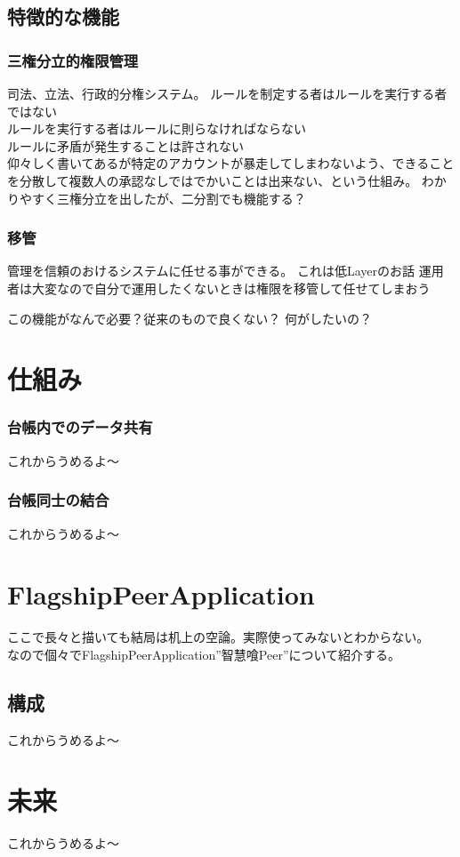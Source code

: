 \documentclass[10pt,a4paper]{jarticle}
\begin{document}
\begin{multicols}{2}
\subsection{特徴的な機能}

\subsubsection{三権分立的権限管理}
司法、立法、行政的分権システム。
ルールを制定する者はルールを実行する者ではない\\
ルールを実行する者はルールに則らなければならない\\
ルールに矛盾が発生することは許されない\\

仰々しく書いてあるが特定のアカウントが暴走してしまわないよう、できることを分散して複数人の承認なしではでかいことは出来ない、という仕組み。
わかりやすく三権分立を出したが、二分割でも機能する？

\subsubsection{移管}
管理を信頼のおけるシステムに任せる事ができる。
これは低Layerのお話
運用者は大変なので自分で運用したくないときは権限を移管して任せてしまおう

この機能がなんで必要？従来のもので良くない？
何がしたいの？

\section{仕組み}

\subsubsection{台帳内でのデータ共有}
これからうめるよ〜

\subsubsection{台帳同士の結合}
これからうめるよ〜

\section{FlagshipPeerApplication}
ここで長々と描いても結局は机上の空論。実際使ってみないとわからない。\\
なので個々でFlagshipPeerApplication”智慧喰Peer”について紹介する。

\subsection{構成}
これからうめるよ〜

\section{未来}
これからうめるよ〜

\end{multicols}
\end{document}
